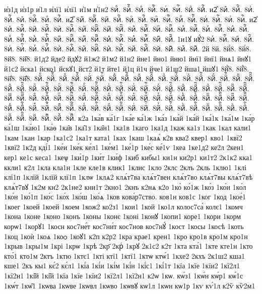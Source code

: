 {и҆з1д
и҆з1р
и҆1л
и҆лї1
и҆лї1
и҆1м
и҆1н2
8иⷠ.
8иⷠ҇.
8иⷡ.
8иⷡ҇.
8иⷢ.
8иⷢ҇.
8иⷣ.
8иⷣ҇.
и2ⷤ
8иⷤ.
8иⷤ҇.
8иⷥ.
8иⷥ҇.
8иⷦ.
8иⷦ҇.
8иⷧ.
8иⷧ҇.
и2ⷨ
8иⷨ.
8иⷨ҇.
8иⷩ.
8иⷩ҇.
8иⷪ.
8иⷪ҇.
8иⷫ.
8иⷫ҇.
8иⷬ.
8иⷬ҇.
8иⷭ.
8иⷭ҇.
8иⷮ.
8иⷮ҇.
и2ⷯ
8иⷯ.
8иⷯ҇.
8иⷰ.
8иⷰ҇.
8иⷱ.
8иⷱ҇.
8иⷲ.
8иⷲ҇.
8иⷳ.
8иⷳ҇.
8иⷴ.
8иⷴ҇.
8иⷵ.
8иⷵ҇.
8иⷶ.
8иⷶ҇.
8иⷷ.
8иⷷ҇.
8иⷸ.
8иⷸ҇.
8иⷹ.
8иⷹ҇.
8иⷺ.
8иⷺ҇.
8иⷻ.
8иⷻ҇.
8иⷼ.
8иⷼ҇.
8иⷽ.
8иⷽ҇.
8иⷾ.
8иⷾ҇.
8иⷿ.
8иⷿ҇.
1и1ꙋ
иꙋ́2
8иꙴ.
8иꙴ҇.
8иꙵ.
8иꙵ҇.
8иꙶ.
8иꙶ҇.
8иꙷ.
8иꙷ҇.
8иꙸ.
8иꙸ҇.
8иꙹ.
8иꙹ҇.
8иꙺ.
8иꙺ҇.
8иꙻ.
8иꙻ҇.
8и꙼.
8и꙼҇.
8и꙽.
8и꙽҇.
2й
8й.
8й̀8.
8й́8.
8й̈8.
8й̑8.
й1д2
йде2
йдꙋ2
й1ж2
й1м2
й1н2
йне1
йно1
йню1
йнї1
йнї1
йнѧ1
йнꙋ1
й1с2
йска1
йско1
йскꙋ1
йст2
й1т
йте1
й1ц
й1ч
йче1
й1ш2
йша1
йшꙋ1
8й҆̀8.
8й҆́8.
8й҆̈8.
8й҆̑8.
8йⷠ.
8йⷠ҇.
8йⷡ.
8йⷡ҇.
8йⷢ.
8йⷢ҇.
8йⷣ.
8йⷣ҇.
8йⷤ.
8йⷤ҇.
8йⷥ.
8йⷥ҇.
8йⷦ.
8йⷦ҇.
8йⷧ.
8йⷧ҇.
8йⷨ.
8йⷨ҇.
8йⷩ.
8йⷩ҇.
8йⷪ.
8йⷪ҇.
8йⷫ.
8йⷫ҇.
8йⷬ.
8йⷬ҇.
8йⷭ.
8йⷭ҇.
8йⷮ.
8йⷮ҇.
8йⷯ.
8йⷯ҇.
8йⷰ.
8йⷰ҇.
8йⷱ.
8йⷱ҇.
8йⷲ.
8йⷲ҇.
8йⷳ.
8йⷳ҇.
8йⷴ.
8йⷴ҇.
8йⷵ.
8йⷵ҇.
8йⷶ.
8йⷶ҇.
8йⷷ.
8йⷷ҇.
8йⷸ.
8йⷸ҇.
8йⷹ.
8йⷹ҇.
8йⷺ.
8йⷺ҇.
8йⷻ.
8йⷻ҇.
8йⷼ.
8йⷼ҇.
8йⷽ.
8йⷽ҇.
8йⷾ.
8йⷾ҇.
8йⷿ.
8йⷿ҇.
8йꙴ.
8йꙴ҇.
8йꙵ.
8йꙵ҇.
8йꙶ.
8йꙶ҇.
8йꙷ.
8йꙷ҇.
8йꙸ.
8йꙸ҇.
8йꙹ.
8йꙹ҇.
8йꙺ.
8йꙺ҇.
8йꙻ.
8йꙻ҇.
8й꙼.
8й꙼҇.
8й꙽.
8й꙽҇.
к2а
1ка́в
ка́1г
1ка́е
ка́1ж
1ка́з
1ка́й
1ка́й
1ка́1к
1ка́1м
1ка́р
ка́1ш
1ка́ю1
1ка́ѳ
1ка̑в
1ка̑1з
1ка̑н1
1ка1в
1каго
1ка1д
1каж
ка1з
1как
1кал
кали1
1кам
1кан
1кар
1ка1с2
1ка1т
ката1
1ках
1каш
1каѧ́
к2в
ква2
квер1
кво1
1квї2
1квї2
1к2д
кді́1
1ке́и
1ке́к
ке́л1
1ке́м1
1ке́1р
1ке́с
ке́1ѵ
1кеа
1ке1д2
ке2л
2кен1
кер1
ке1с
кеса1
1кеѱ
1ки́1р
1ки́т
1ки́ф
1киб
кибы1
ки1н
ки2р1
ки1т2
2к1к2
кка1
ккли1
к2л
1кла
кла1н
1кле
кле1в
клик1
1клис
1кло
2клс
2клъ
2кль
1клю1
1клі
клї1п
1клїй
1клїй
клї1п
1клѡ
1клѧ2
клѧ́т7ва
клѧ́т7вен
клѧ́т7во
клѧ́т7вы
клѧ́т7вѣ
клѧ́т7вꙋ
1к2м
кн2
2к1не2
кни1т
2кно1
2кнъ
к2нѧ
к2о
1ко̀
ко́1ж
1ко́з
1ко́и
1ко́л
1ко́н
1ко́1п
1ко́с
1ко́х
1ко́ш
1ко́ѧ
1ков
кова́р7ство.
ков1н
ков1с
1ког
1код
1кое́1
1коег
1коей
1коей
1коем
1кож2
ко2з1
1кои1
1кой
1ко1л
колос7са́
колє1
1комч
1кона
1коне
1коно
1конъ
1коны
1конє
1коні
1конꙋ
1копи1
коре1
1кори
1корм
корѡ1
1корꙋ1
1косн
кос7не́т
кос7ни́т
кос7нов
кос7нꙋ́
1кост
1косы
1косѣ
1коть
1коц
1коѝ
1коѧ
1коѻ
1коꙋ1
к2п
к2р2
1кра
крае1
крен1
1кро
кро1в
кро1м
кро1н
1крыв
1кры1м
1крі
1крѡ
1крѣ
2кр҃
2крⷭ
1крꙋ
2к1с2
к2т
1кта
кта́1
1кте
кте1н
1кто
кто́1
кто1м
2ктъ
1ктю
1ктє1
1кті
ктї1
1ктї1
1ктѡ
ктѡ́1
1кхе2
2кхъ
2к1ш2
кша1
кше1
2къ
кы1
кє́2
кє́л1
1кі́а
1кі́и
1кі́м
1кі́н
1кі́с1
1кі́1т
1кїа
1кїе
1кїи2
1кї2л1
1кї2н1
1кі̑й
1кі̑й
1кїа
1кїе
1кїи2
1кї2л1
1кї2н1
к2ѡ
1кѡ.
кѡ́з1
1кѡ́н
кѡ́р1
кѡ́1с
1кѡ́т
1кѡ̑1
1кѡва
1кѡве
1кѡвл
1кѡво
1кѡвꙋ
кѡ1л
1кѡн
кѡ1р
1кѵ
кѵ́1л
к2ѷ
кѷ2м1
}
